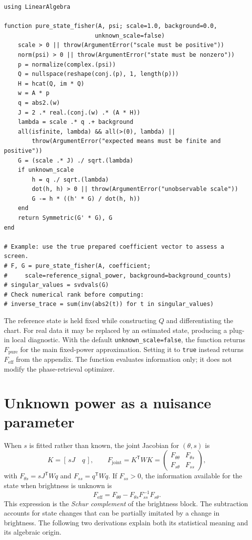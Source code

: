 \documentclass[11pt,a4paper]{article}
\begin{document}
\begin{lstlisting}
using LinearAlgebra

function pure_state_fisher(A, psi; scale=1.0, background=0.0,
                          unknown_scale=false)
    scale > 0 || throw(ArgumentError("scale must be positive"))
    norm(psi) > 0 || throw(ArgumentError("state must be nonzero"))
    p = normalize(complex.(psi))
    Q = nullspace(reshape(conj.(p), 1, length(p)))
    H = hcat(Q, im * Q)
    w = A * p
    q = abs2.(w)
    J = 2 .* real.(conj.(w) .* (A * H))
    lambda = scale .* q .+ background
    all(isfinite, lambda) && all(>(0), lambda) ||
        throw(ArgumentError("expected means must be finite and positive"))
    G = (scale .* J) ./ sqrt.(lambda)
    if unknown_scale
        h = q ./ sqrt.(lambda)
        dot(h, h) > 0 || throw(ArgumentError("unobservable scale"))
        G -= h * ((h' * G) / dot(h, h))
    end
    return Symmetric(G' * G), G
end

# Example: use the true prepared coefficient vector to assess a screen.
# F, G = pure_state_fisher(A, coefficient;
#     scale=reference_signal_power, background=background_counts)
# singular_values = svdvals(G)
# Check numerical rank before computing:
# inverse_trace = sum(inv(abs2(t)) for t in singular_values)
\end{lstlisting}

The reference state is held fixed while constructing $Q$ and differentiating
the chart. For real data it may be replaced by an estimated state, producing
a plug-in local diagnostic. With the default \texttt{unknown\_scale=false}, the function returns
$F_{\mathrm{pure}}$ for the main fixed-power approximation. Setting it to
\texttt{true} instead returns $F_{\mathrm{eff}}$ from the appendix.
The function evaluates information only; it does not modify the
phase-retrieval optimizer.

\clearpage
\appendix
\section{Unknown power as a nuisance parameter}\label{app:unknown-power}
When $s$ is fitted rather than known, the joint Jacobian for $(\theta,s)$ is
\begin{equation}
 K=[\,sJ\quad q\,],\qquad F_{\mathrm{joint}}=K^{\mathsf T}WK
 =\begin{pmatrix}
 F_{\theta\theta}&F_{\theta s}\\
 F_{s\theta}&F_{ss}
 \end{pmatrix},
\end{equation}
with $F_{\theta s}=sJ^{\mathsf T}Wq$ and $F_{ss}=q^{\mathsf T}Wq$.
If $F_{ss}>0$, the information available for the state when brightness is
unknown is
\begin{equation}
 \boxed{F_{\mathrm{eff}}=F_{\theta\theta}
 -F_{\theta s}F_{ss}^{-1}F_{s\theta}.} \label{eq:schur}
\end{equation}
This expression is the \emph{Schur complement} of the brightness block.
The subtraction accounts for state changes that can be partially imitated
by a change in brightness. The following two derivations explain both its
statistical meaning and its algebraic origin.
\end{document}
